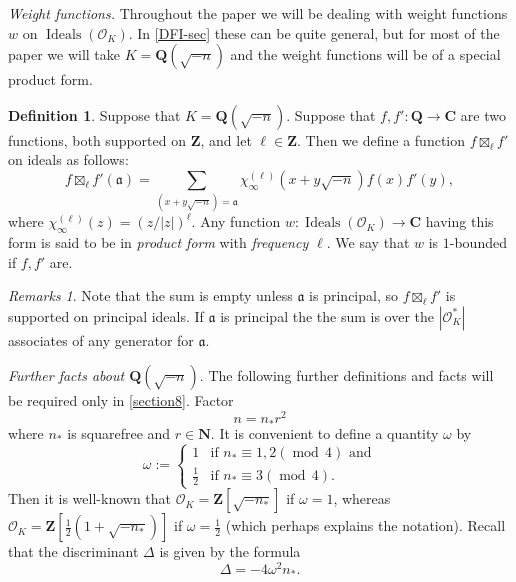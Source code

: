 \documentclass[11pt,reqno]{amsart}
\numberwithin{equation}{section}
\theoremstyle{definition}
\newtheorem{definition}[theorem]{Definition}
\theoremstyle{remark}
\newtheorem*{remarks}{Remarks}
\newcommand{\mf}{\mathfrak}
\newcommand\Z{\mathbf{Z}}
\newcommand\Q{\mathbf{Q}}
\newcommand\C{\mathbf{C}}
\newcommand{\md}[1]{\ensuremath{(\operatorname{mod}\, #1)}}
\newcommand\Ideals{\operatorname{Ideals}}
\renewcommand\O{\mathcal{O}}
\begin{document}
\emph{Weight functions.} Throughout the paper we will be dealing with weight functions $w$ on $\Ideals(\O_K)$. In \cref{DFI-sec} these can be quite general, but for most of the paper we will take $K = \Q(\sqrt{-n})$ and the weight functions will be of a special product form.

\begin{definition}\label{def-product-form}
Suppose that $K = \Q(\sqrt{-n})$. Suppose that $f, f' : \Q \rightarrow \C$ are two functions, both supported on $\Z$, and let $\ell \in \Z$. Then we define a function $f \boxtimes_{\ell} f'$ on ideals as follows:
\begin{equation}\label{product-form} f \boxtimes_{\ell} f'(\mf{a}) = \sum_{(x + y \sqrt{-n}) = \mf{a}} \chi_{\infty}^{(\ell)}(x + y \sqrt{-n}) f(x) f'(y),\end{equation} 
where $\chi_{\infty}^{(\ell)}(z) = (z/|z|)^{\ell}$.
Any function $w : \Ideals(\O_K) \rightarrow \C$ having this form is said to be in \emph{product form} with \emph{frequency $\ell$}. We say that $w$ is $1$-bounded if $f, f'$ are.
\end{definition}
\begin{remarks}
Note that the sum is empty unless $\mf{a}$ is principal, so $f \boxtimes_{\ell} f'$ is supported on principal ideals. If $\mf{a}$ is principal the the sum is over the $|\O^*_K|$ associates of any generator for $\mf{a}$.
\end{remarks}

\emph{Further facts about $\Q(\sqrt{-n})$}. The following further definitions and facts will be required only in \cref{section8}. Factor
\begin{equation}\label{n-nstar} n = n_* r^2 \end{equation} where $n_*$ is squarefree and $r \in \mathbf{N}$. It is convenient to define a quantity $\omega$ by
\begin{equation}\label{omega-def} \omega := \left\{ \begin{array}{ll} 1 & \mbox{if $n_* \equiv 1,2 \md{4}$ and} \\ \frac{1}{2} & \mbox{if $n_* \equiv 3 \md{4}$}.\end{array}\right.\end{equation}
Then it is well-known that $\O_K = \Z[\sqrt{-n_*}]$ if $\omega = 1$, whereas $\O_K = \Z[\frac{1}{2}(1 + \sqrt{-n_*})]$ if $\omega = \frac{1}{2}$ (which perhaps explains the notation). Recall that the discriminant $\Delta$ is given by the formula
\begin{equation}\label{disc-form} \Delta  = -4\omega^2 n_*.\end{equation}
\end{document}
